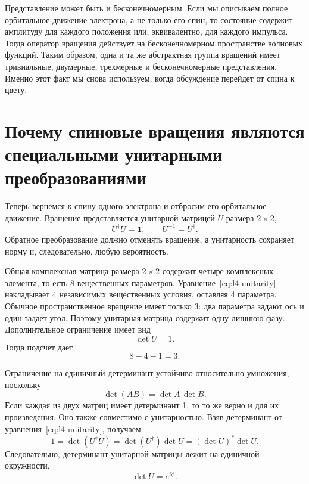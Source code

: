 Представление может быть и бесконечномерным. Если мы описываем полное орбитальное движение электрона, а не только его спин, то состояние содержит амплитуду для каждого положения или, эквивалентно, для каждого импульса. Тогда оператор вращения действует на бесконечномерном пространстве волновых функций. Таким образом, одна и та же абстрактная группа вращений имеет тривиальные, двумерные, трехмерные и бесконечномерные представления. Именно этот факт мы снова используем, когда обсуждение перейдет от спина к цвету.

\section{Почему спиновые вращения являются специальными унитарными преобразованиями}

Теперь вернемся к спину одного электрона и отбросим его орбитальное движение. Вращение представляется унитарной матрицей \(U\) размера \(2\times2\),
\begin{equation}
U^\dagger U=\boldsymbol 1,
\qquad
U^{-1}=U^\dagger.
\label{eq:l4-unitarity}
\end{equation}
Обратное преобразование должно отменять вращение, а унитарность сохраняет норму и, следовательно, любую вероятность.

Общая комплексная матрица размера \(2\times2\) содержит четыре комплексных элемента, то есть 8 вещественных параметров. Уравнение~\eqref{eq:l4-unitarity} накладывает 4 независимых вещественных условия, оставляя 4 параметра. Обычное пространственное вращение имеет только 3: два параметра задают ось и один задает угол. Поэтому унитарная матрица содержит одну лишнюю фазу. Дополнительное ограничение имеет вид
\begin{equation}
\det U=1.
\label{eq:l4-det-one}
\end{equation}
Тогда подсчет дает
\begin{equation}
8-4-1=3.
\end{equation}

Ограничение на единичный детерминант устойчиво относительно умножения, поскольку
\begin{equation}
\det(AB)=\det A\,\det B.
\end{equation}
Если каждая из двух матриц имеет детерминант 1, то то же верно и для их произведения. Оно также совместимо с унитарностью. Взяв детерминант от уравнения~\eqref{eq:l4-unitarity}, получаем
\begin{equation}
1=\det(U^\dagger U)
=\det(U^\dagger)\det U
=(\det U)^*\det U.
\end{equation}
Следовательно, детерминант унитарной матрицы лежит на единичной окружности,
\begin{equation}
\det U=e^{i\phi}.
\end{equation}

